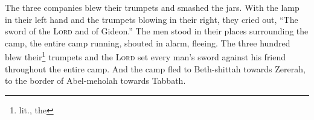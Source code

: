 \begin{inparaenum}
     The three companies blew their trumpets and smashed the jars. With the lamp in their left hand and the trumpets blowing in their right, they cried out, ``The sword of the \textsc{Lord} and of Gideon.''%
     The men stood in their places surrounding the camp, the entire camp running, shouted in alarm, fleeing.%
     The three hundred blew their\footnote{lit., the} trumpets and the \textsc{Lord} set every man's sword against his friend throughout the entire camp. And the camp fled to Beth-shittah towards Zererah, to the border of Abel-meholah towards Tabbath.%
\end{inparaenum}
